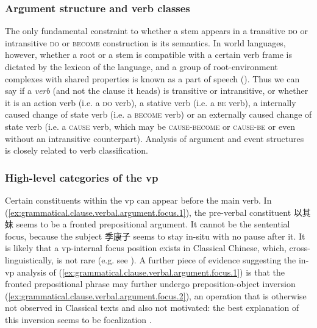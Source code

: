 \documentclass[UTF8, a4paper, oneside, scheme=plain, 12pt]{ctexrep}
\newcommand*{\citepage}[1]{p.~{#1}}
\newcommand*{\category}[1]{\textsc{#1}}
\begin{document}
\subsubsection{Argument structure and verb classes}\label{sec:grammatical.clause.argument.lexical}

The only fundamental constraint to whether a stem appears in a transitive \category{do} or intransitive \category{do} or \category{become} construction is its semantics.
In world languages, however, whether a root or a stem is compatible with a certain verb frame
is dictated by the lexicon of the language,
and a group of root-environment complexes with shared properties 
is known as a part of speech ().
Thus we can say if a \emph{verb} (and not the clause it heads) is transitive or intransitive,
or whether it is an action verb (i.e. a \category{do} verb),
a stative verb (i.e. a \category{be} verb),
a internally caused change of state verb (i.e. a \category{become} verb)
or an externally caused change of state verb (i.e. a \category{cause} verb,
which may be \category{cause}-\category{become} or \category{cause}-\category{be}
or even without an intransitive counterpart).
Analysis of argument and event structures is closely related to verb classification.

\subsubsection{High-level categories of the \ac{vp}}\label{sec:grammatical.clause.argument.high-level}

Certain constituents within the \ac{vp} can appear before the main verb.
In (\ref{ex:grammatical.clause.verbal.argument.focus.1}),
the pre-verbal constituent 以其妹 seems to be a fronted prepositional argument.
It cannot be the sentential focus,
because the subject 季康子 seems to stay in-situ with no pause after it.
It is likely that a \ac{vp}-internal focus position exists in Classical Chinese,
which, cross-linguistically, is not rare (e.g. see \citet{danckaert2011left}).
A further piece of evidence suggesting the in-\ac{vp} analysis of (\ref{ex:grammatical.clause.verbal.argument.focus.1}) is that the fronted prepositional phrase may further undergo preposition-object inversion (\ref{ex:grammatical.clause.verbal.argument.focus.2}),
an operation that is otherwise not observed in Classical texts and also not motivated:
the best explanation of this inversion seems to be focalization
\citep[\citepage{323}]{meiguang2018}.
\end{document}
